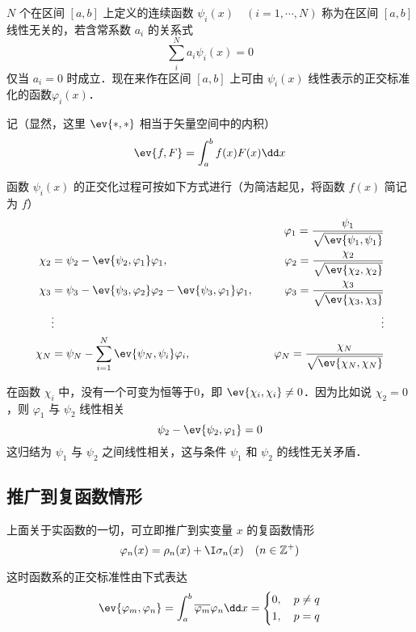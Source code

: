 $N$ 个在区间 $[a,b]$ 上定义的连续函数 $\psi_i(x)\quad (i=1,\cdots ,N)$ 称为在区间 $[a,b]$ 线性无关的，若含常系数 $a_i$ 的关系式
\begin{equation}
\sum_i^N a_i\psi_i(x)=0
\end{equation}
仅当 $a_i=0$ 时成立．现在来作在区间 $[a,b]$ 上可由 ${\psi_i(x)}$ 线性表示的正交标准化的函数${\varphi_i(x)}$．

记（显然，这里 $\ev{*,*}$ 相当于矢量空间中的内积）
\begin{equation}
\ev{f,F}=\int_a^b f(x)F(x)\dd x
\end{equation}

函数 ${\psi_i(x)}$ 的正交化过程可按如下方式进行（为简洁起见，将函数 $f(x)$ 简记为 $f$）
\begin{equation}
\begin{aligned}
&&\varphi_1=\frac{\psi_1}{\sqrt{\ev{\psi_1,\psi_1}}}\\
\chi_2&=\psi_2-\ev{\psi_2,\varphi_1}\varphi_1,\quad&\varphi_2=\frac{\chi_2}{\sqrt{\ev{\chi_2,\chi_2}}}\\
\chi_3&=\psi_3-\ev{\psi_3,\varphi_2}\varphi_2-\ev{\psi_3,\varphi_1}\varphi_1,\quad &\varphi_3=\frac{\chi_3}{\sqrt{\ev{\chi_3,\chi_3}}}\\
&\vdots &\vdots
\\
\chi_N&=\psi_N-\sum_{i=1}^N\ev{\psi_N,\psi_i}\varphi_i,\quad&\varphi_N=\frac{\chi_N}{\sqrt{\ev{\chi_N,\chi_N}}}
\end{aligned}
\end{equation}

在函数 $\chi_i$ 中，没有一个可变为恒等于0，即 $\ev{\chi_i,\chi_i}\neq 0$．因为比如说 $\chi_2=0$，则 $\varphi_1$ 与 $\psi_2$ 线性相关
\begin{equation}
\psi_2-\ev{\psi_2,\varphi_1}=0
\end{equation}
这归结为 $\psi_1$ 与 $\psi_2$ 之间线性相关，这与条件 $\psi_1$ 和 $\psi_2$ 的线性无关矛盾．
\subsection{推广到复函数情形}
上面关于实函数的一切，可立即推广到实变量 $x$ 的复函数情形
\begin{equation}
\varphi_n(x)=\rho_n(x)+\I \sigma_n(x)\quad(n\in \mathbb{Z}^+)
\end{equation}

这时函数系的正交标准性由下式表达
\begin{equation}
\ev{\varphi_m,\varphi_n}=\int_a^b\overline{\varphi_m}\varphi_n\dd x=\left\{
\begin{aligned}
&0, \quad p\neq q\\
&1, \quad p=q
\end{aligned}\right.
\end{equation}
